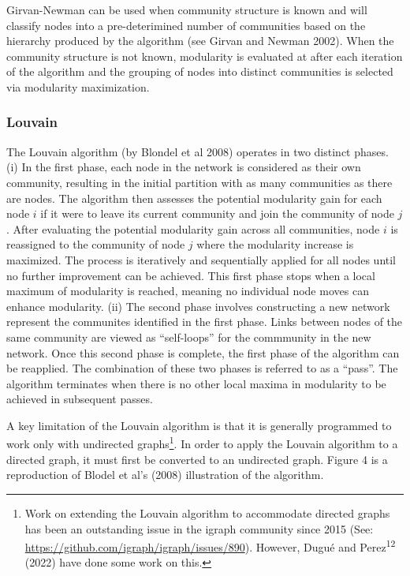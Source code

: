 \documentclass{article}
\begin{document}
Girvan-Newman can be used when community structure is known and will
classify nodes into a pre-deterimined number of communities based on the
hierarchy produced by the algorithm (see Girvan and Newman 2002). When
the community structure is not known, modularity is evaluated at after
each iteration of the algorithm and the grouping of nodes into distinct
communities is selected via modularity maximization.

\subsubsection{Louvain}\label{louvain}

The Louvain algorithm (by Blondel et al 2008) operates in two distinct
phases. (i) In the first phase, each node in the network is considered
as their own community, resulting in the initial partition with as many
communities as there are nodes. The algorithm then assesses the
potential modularity gain for each node \(i\) if it were to leave its
current community and join the community of node \(j\). After evaluating
the potential modularity gain across all communities, node \(i\) is
reassigned to the community of node \(j\) where the modularity increase
is maximized. The process is iteratively and sequentially applied for
all nodes until no further improvement can be achieved. This first phase
stops when a local maximum of modularity is reached, meaning no
individual node moves can enhance modularity. (ii) The second phase
involves constructing a new network represent the communites identified
in the first phase. Links between nodes of the same community are viewed
as ``self-loops'' for the commmunity in the new network. Once this
second phase is complete, the first phase of the algorithm can be
reapplied. The combination of these two phases is referred to as a
``pass''. The algorithm terminates when there is no other local maxima
in modularity to be achieved in subsequent passes.

A key limitation of the Louvain algorithm is that it is generally
programmed to work only with undirected graphs\footnote{Work on
  extending the Louvain algorithm to accommodate directed graphs has
  been an outstanding issue in the igraph community since 2015 (See:
  \url{https://github.com/igraph/igraph/issues/890}). However, Dugué and
  Perez\textsuperscript{12} (2022) have done some work on this.}. In
order to apply the Louvain algorithm to a directed graph, it must first
be converted to an undirected graph. Figure 4 is a reproduction of
Blodel et al's (2008) illustration of the algorithm.
\end{document}
